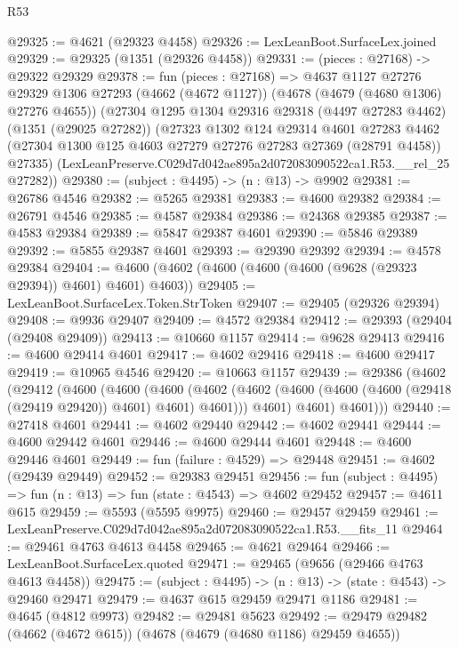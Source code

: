 \begin{lexlean}{R53}
\begin{coremodule}
@29325 := @4621 (@29323 @4458)
@29326 := LexLeanBoot.SurfaceLex.joined
@29329 := @29325 (@1351 (@29326 @4458))
@29331 := (pieces : @27168) -> @29322 @29329
@29378 := fun (pieces : @27168) =>
  @4637
    @1127
    @27276
    @29329
    @1306
    @27293
    (@4662 (@4672 @1127))
    (@4678 (@4679 (@4680 @1306) @27276 @4655))
    (@27304
      @1295
      @1304
      @29316
      @29318
      (@4497 @27283 @4462)
      (@1351 (@29025 @27282))
      (@27323
        @1302
        @124
        @29314
        @4601
        @27283
        @4462
        (@27304 @1300 @125 @4603 @27279 @27276 @27283 @27369 (@28791 @4458))
        @27335)
      (LexLeanPreserve.C029d7d042ae895a2d072083090522ca1.R53.__rel_25 @27282))
@29380 := (subject : @4495) -> (n : @13) -> @9902
@29381 := @26786 @4546
@29382 := @5265 @29381
@29383 := @4600 @29382
@29384 := @26791 @4546
@29385 := @4587 @29384
@29386 := @24368 @29385
@29387 := @4583 @29384
@29389 := @5847 @29387 @4601
@29390 := @5846 @29389
@29392 := @5855 @29387 @4601
@29393 := @29390 @29392
@29394 := @4578 @29384
@29404 := @4600 (@4602 (@4600 (@4600 (@4600 (@9628 (@29323 @29394)) @4601) @4601) @4603))
@29405 := LexLeanBoot.SurfaceLex.Token.StrToken
@29407 := @29405 (@29326 @29394)
@29408 := @9936 @29407
@29409 := @4572 @29384
@29412 := @29393 (@29404 (@29408 @29409))
@29413 := @10660 @1157
@29414 := @9628 @29413
@29416 := @4600 @29414 @4601
@29417 := @4602 @29416
@29418 := @4600 @29417
@29419 := @10965 @4546
@29420 := @10663 @1157
@29439 := @29386
    (@4602
      (@29412
        (@4600
          (@4600
            (@4600
              (@4602 (@4602 (@4600 (@4600 (@4600 (@29418 (@29419 @29420)) @4601) @4601) @4601)))
              @4601)
            @4601)
          @4601)))
@29440 := @27418 @4601
@29441 := @4602 @29440
@29442 := @4602 @29441
@29444 := @4600 @29442 @4601
@29446 := @4600 @29444 @4601
@29448 := @4600 @29446 @4601
@29449 := fun (failure : @4529) => @29448
@29451 := @4602 (@29439 @29449)
@29452 := @29383 @29451
@29456 := fun (subject : @4495) => fun (n : @13) => fun (state : @4543) => @4602 @29452
@29457 := @4611 @615
@29459 := @5593 (@5595 @9975)
@29460 := @29457 @29459
@29461 := LexLeanPreserve.C029d7d042ae895a2d072083090522ca1.R53.__fits_11
@29464 := @29461 @4763 @4613 @4458
@29465 := @4621 @29464
@29466 := LexLeanBoot.SurfaceLex.quoted
@29471 := @29465 (@9656 (@29466 @4763 @4613 @4458))
@29475 := (subject : @4495) -> (n : @13) -> (state : @4543) -> @29460 @29471
@29479 := @4637 @615 @29459 @29471 @1186
@29481 := @4645 (@4812 @9973)
@29482 := @29481 @5623
@29492 := @29479 @29482 (@4662 (@4672 @615)) (@4678 (@4679 (@4680 @1186) @29459 @4655))

\end{coremodule}
\end{lexlean}

